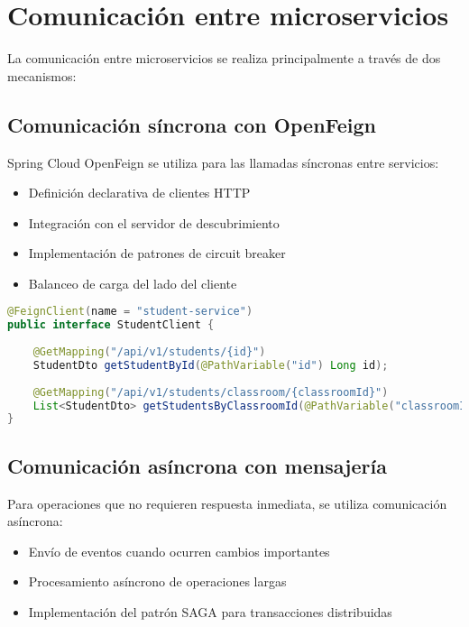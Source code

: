 \documentclass[12pt,a4paper]{report}
\begin{document}
\section{Comunicación entre microservicios}
La comunicación entre microservicios se realiza principalmente a través de dos mecanismos:

\subsection{Comunicación síncrona con OpenFeign}
Spring Cloud OpenFeign se utiliza para las llamadas síncronas entre servicios:

\begin{itemize}
    \item Definición declarativa de clientes HTTP
    \item Integración con el servidor de descubrimiento
    \item Implementación de patrones de circuit breaker
    \item Balanceo de carga del lado del cliente
\end{itemize}

\begin{lstlisting}[language=Java, caption=Cliente Feign para el servicio de estudiantes]
@FeignClient(name = "student-service")
public interface StudentClient {
    
    @GetMapping("/api/v1/students/{id}")
    StudentDto getStudentById(@PathVariable("id") Long id);
    
    @GetMapping("/api/v1/students/classroom/{classroomId}")
    List<StudentDto> getStudentsByClassroomId(@PathVariable("classroomId") Long classroomId);
}
\end{lstlisting}

\subsection{Comunicación asíncrona con mensajería}
Para operaciones que no requieren respuesta inmediata, se utiliza comunicación asíncrona:

\begin{itemize}
    \item Envío de eventos cuando ocurren cambios importantes
    \item Procesamiento asíncrono de operaciones largas
    \item Implementación del patrón SAGA para transacciones distribuidas
\end{itemize}
\end{document}
